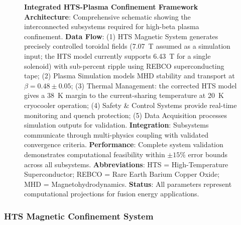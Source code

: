 \documentclass[10pt,twocolumn]{article}
\begin{document}
\begin{figure}[htbp]
\centering
{}
\caption{\textbf{Integrated HTS-Plasma Confinement Framework Architecture}: Comprehensive schematic showing the interconnected subsystems required for high-beta plasma confinement. \textbf{Data Flow}: (1) HTS Magnetic System generates precisely controlled toroidal fields (7.07~T assumed as a simulation input; the HTS model currently supports 6.43~T for a single solenoid) with sub-percent ripple using REBCO superconducting tape; (2) Plasma Simulation models MHD stability and transport at $\beta = 0.48 \pm 0.05$; (3) Thermal Management: the corrected HTS model gives a 38~K margin to the current-sharing temperature at 20~K cryocooler operation; (4) Safety \& Control Systems provide real-time monitoring and quench protection; (5) Data Acquisition processes simulation outputs for validation. \textbf{Integration}: Subsystems communicate through multi-physics coupling with validated convergence criteria. \textbf{Performance}: Complete system validation demonstrates computational feasibility within $\pm15\%$ error bounds across all subsystems. \textbf{Abbreviations}: HTS = High-Temperature Superconductor; REBCO = Rare Earth Barium Copper Oxide; MHD = Magnetohydrodynamics. \textbf{Status}: All parameters represent computational projections for fusion energy applications.}
\label{fig:framework}
\end{figure}

\subsubsection{HTS Magnetic Confinement System}
\end{document}
